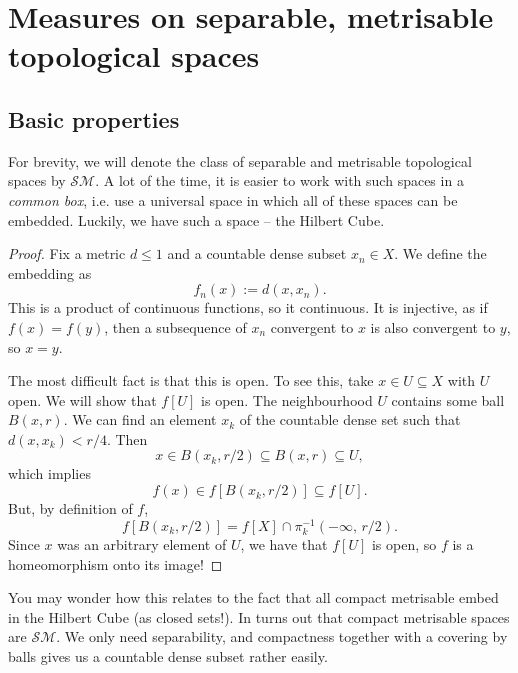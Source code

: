 \chapter{Measures on separable, metrisable topological spaces}

\section{Basic properties}

For brevity, we will denote the class of separable and metrisable topological spaces by \( \mathcal{SM} \). A lot of the time, it is easier to work with such spaces in a \emph{common box}, i.e. use a universal space in which all of these spaces can be embedded. Luckily, we have such a space -- the Hilbert Cube.


\begin{proof}
    Fix a metric \( d \leqslant 1 \) and a countable dense subset \( x_n \in X \). We define the embedding as 
    \[ 
       f_n(x) := d(x, x_n). 
   \]
   This is a product of continuous functions, so it continuous. It is injective, as if \( f(x) = f(y) \), then a subsequence of \( x_n \) convergent to \( x \) is also convergent to \( y \), so \( x = y \). 

   The most difficult fact is that this is open. To see this, take \( x \in U \subseteq X \) with \( U \) open. We will show that \( f[U] \) is open. The neighbourhood \( U \) contains some ball \( B(x, r) \). We can find an element \( x_k \) of the countable dense set such that \( d(x, x_k) < r/4 \). Then
   \[ 
      x \in B(x_k, r/2) \subseteq B(x, r) \subseteq U,
  \]
  which implies
  \[ 
      f(x) \in f \left[ B(x_k, r/2) \right] \subseteq f[U]. 
 \]
 But, by definition of \( f \),
 \[ 
     f \left[ B(x_k, r/2) \right] = f[X] \cap \pi_k^{-1} (-\infty,\, r/2).
\]
Since \( x \) was an arbitrary element of \( U \), we have that \( f[U] \) is open, so \( f \) is a homeomorphism onto its image!
\end{proof}

You may wonder how this relates to the fact that all compact metrisable embed in the Hilbert Cube (as closed sets!). In turns out that compact metrisable spaces are \( \mathcal{SM} \). We only need separability, and compactness together with a covering by balls gives us a countable dense subset rather easily.

